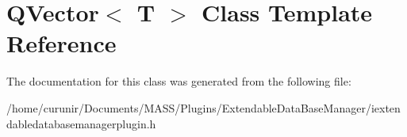 \hypertarget{class_q_vector}{}\section{Q\+Vector$<$ T $>$ Class Template Reference}
\label{class_q_vector}


The documentation for this class was generated from the following file\+:\begin{DoxyCompactItemize}
\item 
/home/curunir/\+Documents/\+M\+A\+S\+S/\+Plugins/\+Extendable\+Data\+Base\+Manager/iextendabledatabasemanagerplugin.\+h\end{DoxyCompactItemize}
